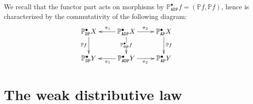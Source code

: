 \documentclass[preprint,12pt]{elsarticle}
\newcommand\Pred{\mathbb{P}}
\newcommand\Angel{{\mathtt{A}}}
\newcommand\Demon{{\mathtt{D}}}
\newcommand\Nature{{\mathtt{P}}}
\newcommand\AN{{\Angel\Nature}}
\newcommand\DN{{\Demon\Nature}}
\newcommand\ADN{{\Angel\Demon\Nature}}
\begin{document}
We recall that the functor part acts on morphisms by
$\Pred_\ADN^\bullet f = (\Pred f, \Pred f)$, hence is characterized by
the commutativity of the following diagram:
\begin{equation}
  \label{eq:PADNf}
  \xymatrix{
    \Pred_\DN^\bullet X
    \ar[d]_{\Pred f}
    &
    \Pred_\ADN^\bullet X
    \ar[l]_{\pi_1}
    \ar[d]|{\Pred_\ADN^\bullet f}
    \ar[r]^{\pi_2}
    &
    \Pred_\AN^\bullet X
    \ar[d]^{\Pred f}
    \\
    \Pred_\DN^\bullet Y
    &
    \Pred_\ADN^\bullet Y
    \ar[l]^{\pi_1}
    \ar[r]_{\pi_2}
    &
    \Pred_\AN^\bullet Y
    }
\end{equation}

\section{The weak distributive law}
\label{sec:weak-distr-law:nat}
\end{document}
